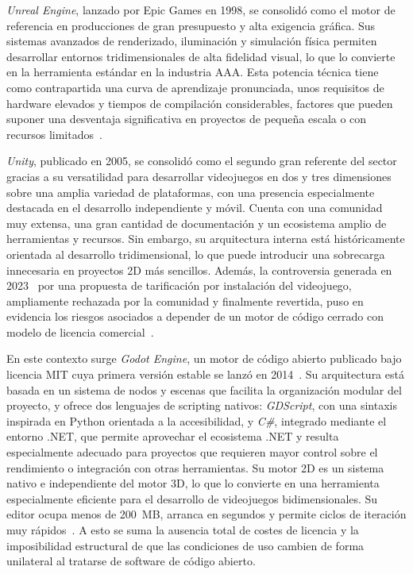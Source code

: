 \textit{Unreal Engine}, lanzado por Epic Games en 1998, se consolidó como el motor de referencia en producciones de gran presupuesto y alta exigencia gráfica. Sus sistemas avanzados de renderizado, iluminación y simulación física permiten desarrollar entornos tridimensionales de alta fidelidad visual, lo que lo convierte en la herramienta estándar en la industria AAA. Esta potencia técnica tiene como contrapartida una curva de aprendizaje pronunciada, unos requisitos de hardware elevados y tiempos de compilación considerables, factores que pueden suponer una desventaja significativa en proyectos de pequeña escala o con recursos limitados~\cite{unrealengine_features}.

\textit{Unity}, publicado en 2005, se consolidó como el segundo gran referente del sector gracias a su versatilidad para desarrollar videojuegos en dos y tres dimensiones sobre una amplia variedad de plataformas, con una presencia especialmente destacada en el desarrollo independiente y móvil. Cuenta con una comunidad muy extensa, una gran cantidad de documentación y un ecosistema amplio de herramientas y recursos. Sin embargo, su arquitectura interna está históricamente orientada al desarrollo tridimensional, lo que puede introducir una sobrecarga innecesaria en proyectos 2D más sencillos. Además, la controversia generada en 2023~\cite{unity_runtimefee_apology, unity_runtimefee_cancelled} por una propuesta de tarificación por instalación del videojuego, ampliamente rechazada por la comunidad y finalmente revertida, puso en evidencia los riesgos asociados a depender de un motor de código cerrado con modelo de licencia comercial~\cite{unity_overview}.

En este contexto surge \textit{Godot Engine}, un motor de código abierto publicado bajo licencia MIT cuya primera versión estable se lanzó en 2014~\cite{GodotDocs}. Su arquitectura está basada en un sistema de nodos y escenas que facilita la organización modular del proyecto, y ofrece dos lenguajes de scripting nativos: \textit{GDScript}, con una sintaxis inspirada en Python orientada a la accesibilidad, y \textit{C\#}, integrado mediante el entorno .NET, que permite aprovechar el ecosistema .NET y resulta especialmente adecuado para proyectos que requieren mayor control sobre el rendimiento o integración con otras herramientas. Su motor 2D es un sistema nativo e independiente del motor 3D, lo que lo convierte en una herramienta especialmente eficiente para el desarrollo de videojuegos bidimensionales. Su editor ocupa menos de 200~MB, arranca en segundos y permite ciclos de iteración muy rápidos~\cite{godot_features}. A esto se suma la ausencia total de costes de licencia y la imposibilidad estructural de que las condiciones de uso cambien de forma unilateral al tratarse de software de código abierto.

